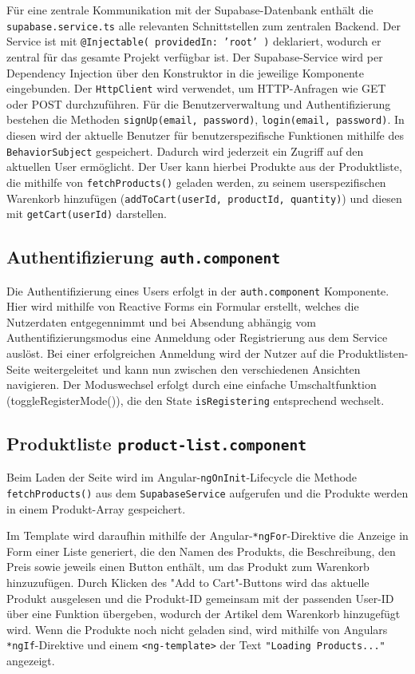 \documentclass[oneside]{ausarbeitung}
\begin{document}
Für eine zentrale Kommunikation mit der Supabase-Datenbank enthält die \texttt{supabase.service.ts} alle relevanten Schnittstellen zum zentralen Backend.
Der Service ist mit \texttt{@Injectable({ providedIn: 'root' })} deklariert, wodurch er zentral für das gesamte Projekt verfügbar ist. Der Supabase-Service wird per Dependency Injection über den Konstruktor in die jeweilige Komponente eingebunden. Der \texttt{HttpClient} wird verwendet, um HTTP-Anfragen wie GET oder POST durchzuführen. Für die Benutzerverwaltung und Authentifizierung bestehen die Methoden \texttt{signUp(email, password)}, \texttt{login(email, password)}. In diesen wird der aktuelle Benutzer für benutzerspezifische Funktionen mithilfe des \texttt{BehaviorSubject} gespeichert. Dadurch wird jederzeit ein Zugriff auf den aktuellen User ermöglicht. Der User kann hierbei Produkte aus der Produktliste, die mithilfe von \texttt{fetchProducts()} geladen werden, zu seinem userspezifischen Warenkorb hinzufügen (\texttt{addToCart(userId, productId, quantity)}) und diesen mit \texttt{getCart(userId)} darstellen.

\subsection{Authentifizierung \texttt{auth.component}}

Die Authentifizierung eines Users erfolgt in der \texttt{auth.component} Komponente. Hier wird mithilfe von Reactive Forms ein Formular erstellt, welches die Nutzerdaten entgegennimmt und bei Absendung abhängig vom Authentifizierungsmodus eine Anmeldung oder Registrierung aus dem Service auslöst. Bei einer erfolgreichen Anmeldung wird der Nutzer auf die Produktlisten-Seite weitergeleitet und kann nun zwischen den verschiedenen Ansichten navigieren. Der Moduswechsel erfolgt durch eine einfache Umschaltfunktion (toggleRegisterMode()), die den State \texttt{isRegistering} entsprechend wechselt.

\subsection{Produktliste \texttt{product-list.component}}

Beim Laden der Seite wird im Angular-\texttt{ngOnInit}-Lifecycle die Methode \texttt{fetchProducts()} aus dem \texttt{SupabaseService} aufgerufen und die Produkte werden in einem Produkt-Array gespeichert.

Im Template wird daraufhin mithilfe der Angular-\texttt{*ngFor}-Direktive die Anzeige in Form einer Liste generiert, die den Namen des Produkts, die Beschreibung, den Preis sowie jeweils einen Button enthält, um das Produkt zum Warenkorb hinzuzufügen.
Durch Klicken des "Add to Cart"-Buttons wird das aktuelle Produkt ausgelesen und die Produkt-ID gemeinsam mit der passenden User-ID über eine Funktion übergeben, wodurch der Artikel dem Warenkorb hinzugefügt wird.
Wenn die Produkte noch nicht geladen sind, wird mithilfe von Angulars \texttt{*ngIf}-Direktive und einem \texttt{<ng-template>} der Text \texttt{"Loading Products..."} angezeigt.
\end{document}
